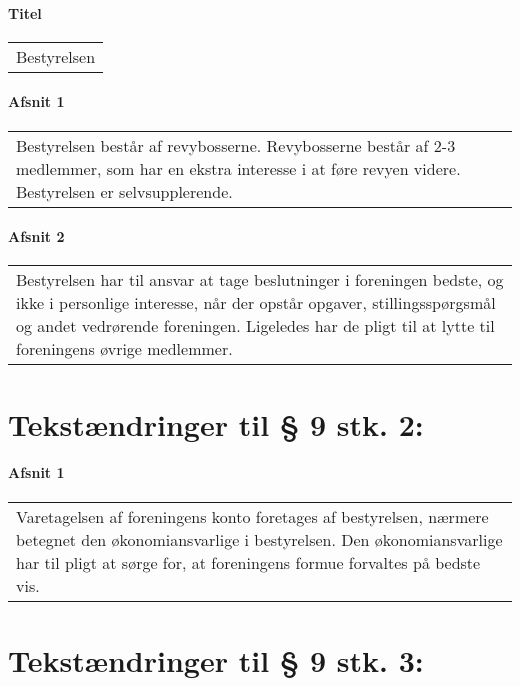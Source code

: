 \documentclass[a4paper,11pt]{report}
\newenvironment{quotationb}%
{\begin{tabular}{|p{10cm}}}%
{\\\end{tabular}}
\begin{document}
\begin{appendices}
\paragraph{Titel}

\begin{quotationb}
Bestyrelsen
\end{quotationb}

\paragraph{Afsnit 1}

\begin{quotationb}
Bestyrelsen består af revybosserne.  Revybosserne består af 2-3 medlemmer,
som har en ekstra interesse i at føre revyen videre.  Bestyrelsen er
selvsupplerende.
\end{quotationb}

\paragraph{Afsnit 2}

\begin{quotationb}
Bestyrelsen har til ansvar at tage beslutninger i foreningen bedste, og ikke
i personlige interesse, når der opstår opgaver, stillingsspørgsmål og andet
vedrørende foreningen.  Ligeledes har de pligt til at lytte til foreningens
øvrige medlemmer.
\end{quotationb}

\section*{Tekstændringer til § 9 stk. 2:}

\paragraph{Afsnit 1}

\begin{quotationb}
Varetagelsen af foreningens konto foretages af bestyrelsen, nærmere betegnet
den økonomiansvarlige i bestyrelsen.  Den økonomiansvarlige har til pligt at
sørge for, at foreningens formue forvaltes på bedste vis.
\end{quotationb}

\section*{Tekstændringer til § 9 stk. 3:}


\end{appendices}
\end{document}

